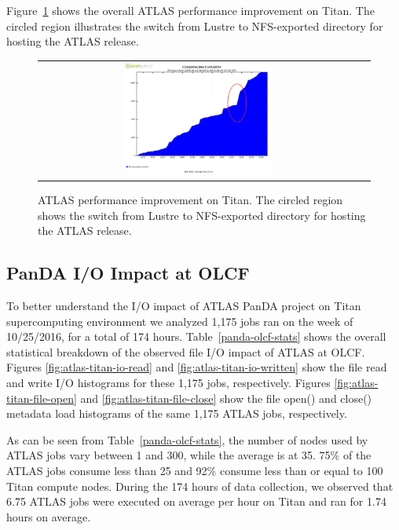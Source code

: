 Figure~\ref{fig:atlas-perf-improvement} shows the overall ATLAS performance
improvement on Titan. The circled region illustrates the switch from Lustre to
NFS-exported directory for hosting the ATLAS release.

\begin{figure}[!htb]
    \centering
    \begin{tabular}{cc}
        {\includegraphics[width=0.48\textwidth]{figures/panda-completed-jobs-sw-move.pdf}}\\
    \end{tabular}
    \caption{ATLAS performance improvement on Titan. The circled region shows the switch from Lustre to NFS-exported directory for hosting the ATLAS release.}
    \label{fig:atlas-perf-improvement}
\end{figure}



\subsection{PanDA I/O Impact at OLCF}


To better understand the I/O impact of ATLAS PanDA project on Titan
supercomputing environment we analyzed 1,175 jobs ran on the week of
10/25/2016, for a total of 174 hours. Table~\ref{panda-olcf-stats} shows the
overall statistical breakdown of the observed file I/O impact of ATLAS at OLCF.
Figures \ref{fig:atlas-titan-io-read} and \ref{fig:atlas-titan-io-written} show
the file read and write I/O histograms for these 1,175 jobs, respectively.
Figures \ref{fig:atlas-titan-file-open} and \ref{fig:atlas-titan-file-close}
show the file open() and close() metadata load histograms of the same 1,175
ATLAS jobs, respectively.
  
As can be seen from Table~\ref{panda-olcf-stats}, the number of nodes used by
ATLAS jobs vary between 1 and 300, while the average is at 35. 75\% of the
ATLAS jobs consume less than 25 and 92\% consume less than or equal to 100
Titan compute nodes. During the 174 hours of data collection, we observed that
6.75 ATLAS jobs were executed on average per hour on Titan and ran for
1.74 hours on average. 

